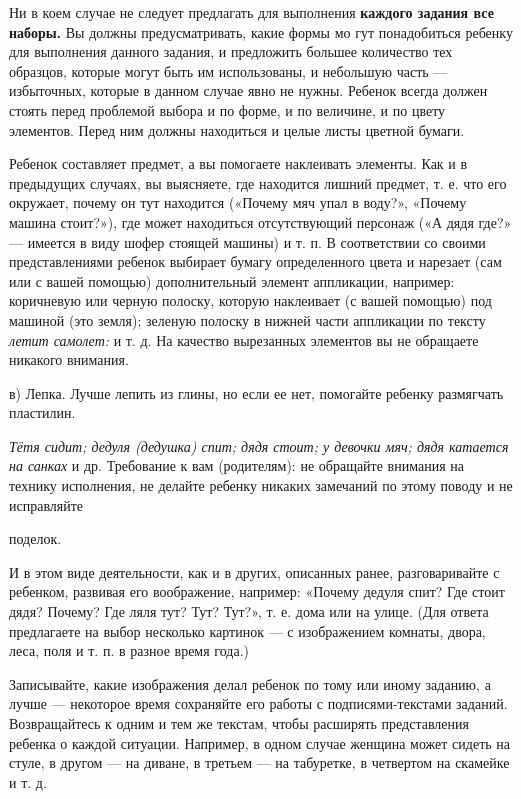 \documentclass[a5paper]{book}
\renewcommand{\emph}[1]{\textit{#1}}
\begin{document}
Ни в коем случае не следует предлагать для выполнения \textbf{каждого
задания все наборы.} Вы должны предусматривать, какие формы мо гут
понадобиться ребенку для выполнения данного задания, и предложить
большее количество тех образцов, которые могут быть им использованы, и
небольшую часть --- избыточных, которые в данном случае явно не нужны.
Ребенок всегда должен стоять перед проблемой выбора и по форме, и по
величине, и по цвету элементов. Перед ним должны находиться и целые
листы цветной бумаги.

Ребенок составляет предмет, а вы помогаете наклеивать элементы. Как и в
предыдущих случаях, вы выясняете, где находится лишний предмет, т. е.
что его окружает, почему он тут находится («Почему мяч упал в воду?»,
«Почему машина стоит?»), где может находиться отсутствующий персонаж («А
дядя где?» --- имеется в виду шофер стоящей машины) и т. п. В
соответствии со своими представлениями ребенок выбирает бумагу
определенного цвета и нарезает (сам или с вашей помощью) дополнительный
элемент аппликации, например: коричневую или черную полоску, которую
наклеивает (с вашей помощью) под машиной (это земля); зеленую полоску в
нижней части аппликации по тексту \emph{летит самолет:} и т. д. На
качество вырезанных элементов вы не обращаете никакого внимания.

в) Лепка. Лучше лепить из глины, но если ее нет, помогайте ребенку
размягчать пластилин.

\emph{Тётя сидит; дедуля (дедушка) спит; дядя стоит; у девочки мяч; дядя
катается на санках} и др. Требование к вам (родителям): не обращайте
внимания на технику исполнения, не делайте ребенку никаких замечаний по
этому поводу и не исправляйте

поделок.

И в этом виде деятельности, как и в других, описанных ранее,
разговаривайте с ребенком, развивая его воображение, например: «Почему
дедуля спит? Где стоит дядя? Почему? Где ляля тут? Тут? Тут?», т. е.
дома или на улице. (Для ответа предлагаете на выбор несколько картинок
--- с изображением комнаты, двора, леса, поля и т. п. в разное время
года.)

Записывайте, какие изображения делал ребенок по тому или иному заданию,
а лучше --- некоторое время сохраняйте его работы с подписями-текстами
заданий. Возвращайтесь к одним и тем же текстам, чтобы расширять
представления ребенка о каждой ситуации. Например, в одном случае
женщина может сидеть на стуле, в другом --- на диване, в третьем --- на
табуретке, в четвертом на скамейке и т. д.
\end{document}
